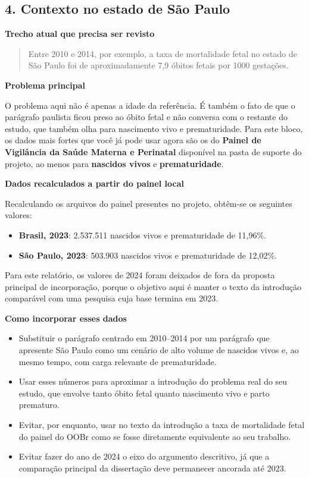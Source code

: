 \documentclass[12pt,a4paper]{article}
\begin{document}
\subsection*{4. Contexto no estado de São Paulo}

\textbf{Trecho atual que precisa ser revisto}

\begin{quote}
Entre 2010 e 2014, por exemplo, a taxa de mortalidade fetal no estado de São Paulo foi de aproximadamente 7,9 óbitos fetais por 1000 gestações.
\end{quote}

\textbf{Problema principal}

O problema aqui não é apenas a idade da referência. É também o fato de que o parágrafo paulista ficou preso ao óbito fetal e não conversa com o restante do estudo, que também olha para nascimento vivo e prematuridade. Para este bloco, os dados mais fortes que você já pode usar agora são os do \textbf{Painel de Vigilância da Saúde Materna e Perinatal} disponível na pasta de suporte do projeto, ao menos para \textbf{nascidos vivos} e \textbf{prematuridade}.

\textbf{Dados recalculados a partir do painel local}

Recalculando os arquivos do painel presentes no projeto, obtêm-se os seguintes valores:

\begin{itemize}
\item \textbf{Brasil, 2023}: 2.537.511 nascidos vivos e prematuridade de 11,96\%.
\item \textbf{São Paulo, 2023}: 503.903 nascidos vivos e prematuridade de 12,02\%.
\end{itemize}

Para este relatório, os valores de 2024 foram deixados de fora da proposta principal de incorporação, porque o objetivo aqui é manter o texto da introdução comparável com uma pesquisa cuja base termina em 2023.

\textbf{Como incorporar esses dados}

\begin{itemize}
\item Substituir o parágrafo centrado em 2010--2014 por um parágrafo que apresente São Paulo como um cenário de alto volume de nascidos vivos e, ao mesmo tempo, com carga relevante de prematuridade.
\item Usar esses números para aproximar a introdução do problema real do seu estudo, que envolve tanto óbito fetal quanto nascimento vivo e parto prematuro.
\item Evitar, por enquanto, usar no texto da introdução a taxa de mortalidade fetal do painel do OOBr como se fosse diretamente equivalente ao seu trabalho.
\item Evitar fazer do ano de 2024 o eixo do argumento descritivo, já que a comparação principal da dissertação deve permanecer ancorada até 2023.
\end{itemize}
\end{document}

